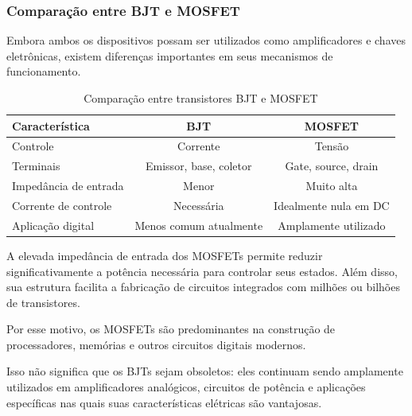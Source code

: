 \subsubsection{Comparação entre BJT e MOSFET}

Embora ambos os dispositivos possam ser utilizados como amplificadores e chaves eletrônicas, existem diferenças importantes em seus mecanismos de funcionamento.

\begin{table}[H]
    \centering
    \caption{Comparação entre transistores BJT e MOSFET}
    \label{tab:bjt-mosfet}
    \begin{tabular}{|l|c|c|}
        \hline
        \textbf{Característica} & \textbf{BJT} & \textbf{MOSFET} \\
        \hline
        Controle & Corrente & Tensão \\
        \hline
        Terminais & Emissor, base, coletor & Gate, source, drain \\
        \hline
        Impedância de entrada & Menor & Muito alta \\
        \hline
        Corrente de controle & Necessária & Idealmente nula em DC \\
        \hline
        Aplicação digital & Menos comum atualmente & Amplamente utilizado \\
        \hline
    \end{tabular}
\end{table}

A elevada impedância de entrada dos MOSFETs permite reduzir significativamente a potência necessária para controlar seus estados. Além disso, sua estrutura facilita a fabricação de circuitos integrados com milhões ou bilhões de transistores.

Por esse motivo, os MOSFETs são predominantes na construção de processadores, memórias e outros circuitos digitais modernos.

Isso não significa que os BJTs sejam obsoletos: eles continuam sendo amplamente utilizados em amplificadores analógicos, circuitos de potência e aplicações específicas nas quais suas características elétricas são vantajosas.